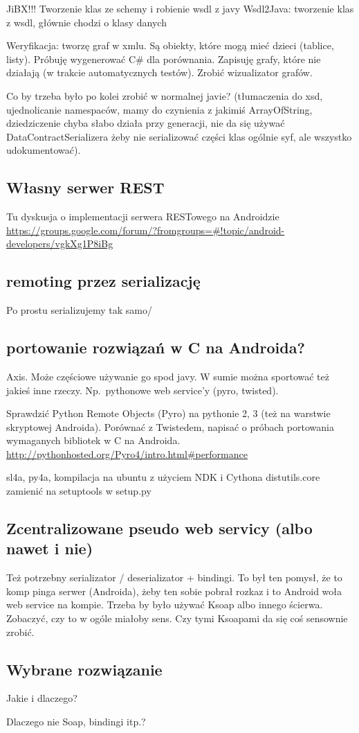 JiBX!!! Tworzenie klas ze schemy i robienie wsdl z javy
Wsdl2Java: tworzenie klas z wsdl, głównie chodzi o klasy danych

Weryfikacja: tworzę graf w xmlu. Są obiekty, które mogą mieć dzieci (tablice, listy). Próbuję wygenerować C\# dla porównania. Zapisuję grafy, które nie działają (w trakcie automatycznych testów). Zrobić wizualizator grafów.

Co by trzeba było po kolei zrobić w normalnej javie? (tłumaczenia do xsd, ujednolicanie namespaców, mamy do czynienia z jakimiś ArrayOfString, dziedziczenie chyba słabo działa przy generacji, nie da się używać DataContractSerializera żeby nie serializować części klas ogólnie syf, ale wszystko udokumentować). 

\subsection{Własny serwer REST}
Tu dyskusja o implementacji serwera RESTowego na Androidzie \url{https://groups.google.com/forum/?fromgroups=#!topic/android-developers/vgkXg1P8iBg}

\subsection{remoting przez serializację}
Po prostu serializujemy tak samo/

\subsection{portowanie rozwiązań w C na Androida?}
Axis. Może częściowe używanie go spod javy. W sumie można sportować też jakieś inne rzeczy. Np.\ pythonowe web service'y (pyro, twisted).

Sprawdzić Python Remote Objects (Pyro) na pythonie 2, 3 (też na warstwie skryptowej Androida). Porównać z Twistedem, napisać o próbach portowania wymaganych bibliotek w C na Androida. \url{http://pythonhosted.org/Pyro4/intro.html#performance}

sl4a, py4a, kompilacja na ubuntu z użyciem NDK i Cythona
distutils.core zamienić na setuptools w setup.py

\subsection{Zcentralizowane pseudo web servicy (albo nawet i nie)}
Też potrzebny serializator / deserializator + bindingi. To był ten pomysł, że to komp pinga serwer (Androida), żeby ten sobie pobrał rozkaz i to Android woła web service na kompie. Trzeba by było używać Ksoap albo innego ścierwa. Zobaczyć, czy to w ogóle miałoby sens. Czy tymi Ksoapami da się coś sensownie zrobić.

\subsection{Wybrane rozwiązanie}
Jakie i dlaczego?

Dlaczego nie Soap, bindingi itp.?
